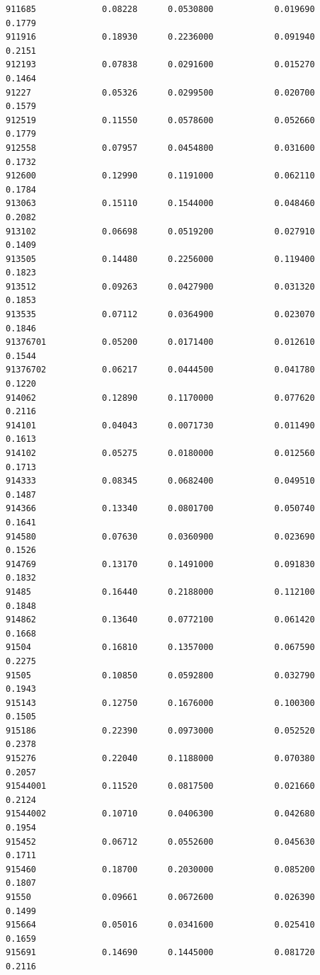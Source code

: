 \documentclass[
  letterpaper,
  DIV=11,
  numbers=noendperiod]{scrartcl}
\begin{document}
\begin{verbatim}
911685             0.08228      0.0530800            0.019690        0.1779
911916             0.18930      0.2236000            0.091940        0.2151
912193             0.07838      0.0291600            0.015270        0.1464
91227              0.05326      0.0299500            0.020700        0.1579
912519             0.11550      0.0578600            0.052660        0.1779
912558             0.07957      0.0454800            0.031600        0.1732
912600             0.12990      0.1191000            0.062110        0.1784
913063             0.15110      0.1544000            0.048460        0.2082
913102             0.06698      0.0519200            0.027910        0.1409
913505             0.14480      0.2256000            0.119400        0.1823
913512             0.09263      0.0427900            0.031320        0.1853
913535             0.07112      0.0364900            0.023070        0.1846
91376701           0.05200      0.0171400            0.012610        0.1544
91376702           0.06217      0.0444500            0.041780        0.1220
914062             0.12890      0.1170000            0.077620        0.2116
914101             0.04043      0.0071730            0.011490        0.1613
914102             0.05275      0.0180000            0.012560        0.1713
914333             0.08345      0.0682400            0.049510        0.1487
914366             0.13340      0.0801700            0.050740        0.1641
914580             0.07630      0.0360900            0.023690        0.1526
914769             0.13170      0.1491000            0.091830        0.1832
91485              0.16440      0.2188000            0.112100        0.1848
914862             0.13640      0.0772100            0.061420        0.1668
91504              0.16810      0.1357000            0.067590        0.2275
91505              0.10850      0.0592800            0.032790        0.1943
915143             0.12750      0.1676000            0.100300        0.1505
915186             0.22390      0.0973000            0.052520        0.2378
915276             0.22040      0.1188000            0.070380        0.2057
91544001           0.11520      0.0817500            0.021660        0.2124
91544002           0.10710      0.0406300            0.042680        0.1954
915452             0.06712      0.0552600            0.045630        0.1711
915460             0.18700      0.2030000            0.085200        0.1807
91550              0.09661      0.0672600            0.026390        0.1499
915664             0.05016      0.0341600            0.025410        0.1659
915691             0.14690      0.1445000            0.081720        0.2116

\end{verbatim}
\end{document}
